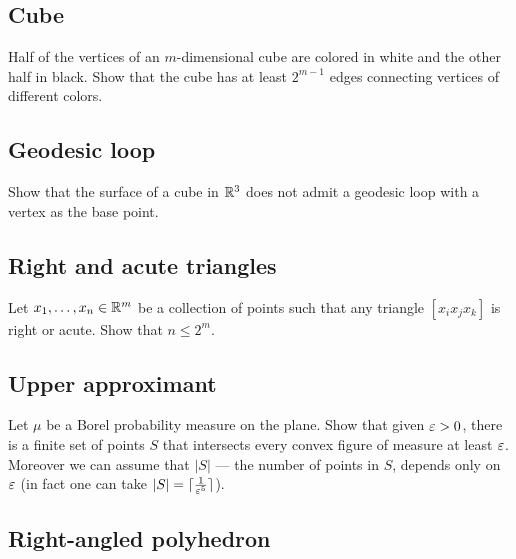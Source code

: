 \subsection*{Cube}\label{Cube}

\begin{pr}
Half of the vertices 
of an $m$-dimensional cube
are colored in white and the other half in black.
Show that the cube has at least $2^{m-1}$ edges connecting vertices of different colors. 
\end{pr}

\subsection*{Geodesic loop}\label{Geodesic loop}

\begin{pr}
Show that the surface of a cube in $\mathbb{R}^3$
does not admit a geodesic loop with a vertex as the base point.
\end{pr}

\subsection*{Right and acute triangles}\label{Right and acute triangles}

\begin{pr}
Let $x_1,\dots,x_n\in\mathbb{R}^m$
be a collection of points such that any triangle $[x_ix_jx_k]$ is right or acute.
Show that $n\le 2^m$.
\end{pr}

\subsection*{Upper approximant}\label{One-sided approximants}

\begin{pr}
Let $\mu$ be a Borel probability measure on the plane.
Show that given $\varepsilon>0$, there is a finite set of points $S$ that intersects every convex figure of measure at least $\varepsilon$.
Moreover we can assume that $|S|$ --- the number of points in $S$, depends only on $\varepsilon$ (in fact one can take $|S|=\lceil\tfrac1{\varepsilon^5}\rceil$).
\end{pr}

\subsection*{Right-angled polyhedron\thm}\label{Right-angled polyhedron}

